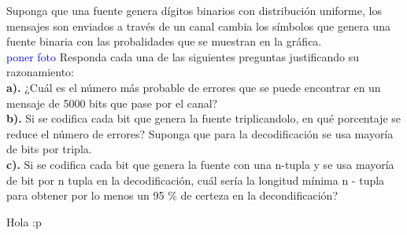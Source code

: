 
Suponga que una fuente genera dígitos binarios con distribución uniforme, los mensajes son enviados a través de un canal cambia los símbolos que genera una fuente binaria con las probalidades que se muestran en la gráfica.\\
\textcolor{blue}{poner foto}
Responda cada una de las siguientes preguntas justificando su razonamiento:\\
\textbf{a).} ¿Cuál es el número más probable de errores que se puede encontrar en un mensaje de 5000 bits que pase por el canal?\\
\textbf{b).} Si se codifica cada bit que genera la fuente triplicandolo, en qué porcentaje se reduce el número de errores? Suponga que para la decodificación
se usa mayoría de bits por tripla.\\
\textbf{c).} Si se codifica cada bit que genera la fuente con una n-tupla y se usa mayoría de bit por n tupla en la decodificación, cuál sería la longitud
mínima n - tupla para obtener por lo menos un 95 $\%$ de certeza en la decondificación?

\begin{sol}
    Hola :p
\end{sol}
